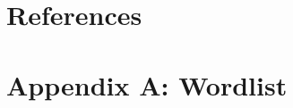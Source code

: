 \documentclass[12pt]{ouparticle}
\begin{document}


\section*{References}

\newpage

\section*{Appendix A: Wordlist}
\end{document}
